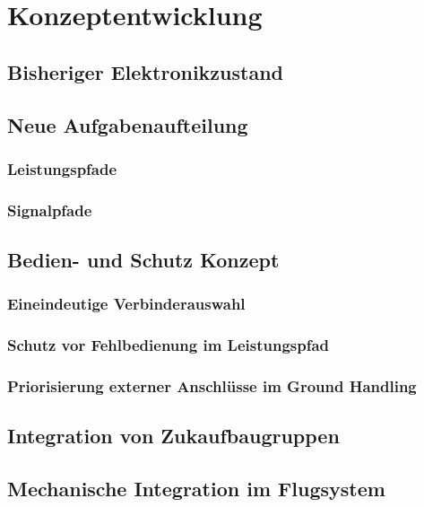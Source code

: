 \chapter{Konzeptentwicklung}\label{cha:Konzeptenwicklung}

\section{Bisheriger Elektronikzustand}

\section{Neue Aufgabenaufteilung}

\subsection{Leistungspfade}

\subsection{Signalpfade}

\section{Bedien- und Schutz Konzept}

\subsection{Eineindeutige Verbinderauswahl}

\subsection{Schutz vor Fehlbedienung im Leistungspfad}

\subsection{Priorisierung externer Anschlüsse im Ground Handling}

\section{Integration von Zukaufbaugruppen}

\section{Mechanische Integration im Flugsystem}